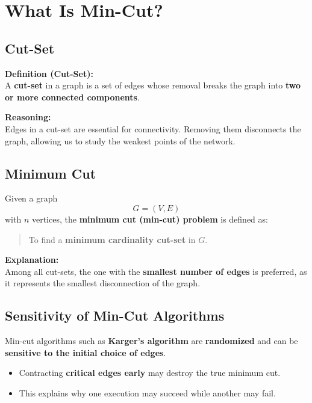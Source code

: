\documentclass[11pt]{article}
\begin{document}

\section{What Is Min-Cut?}

\subsection{Cut-Set}

\textbf{Definition (Cut-Set):} \\
A \textbf{cut-set} in a graph is a set of edges whose removal breaks the graph into \textbf{two or more connected components}.

\medskip
\textbf{Reasoning:} \\
Edges in a cut-set are essential for connectivity. Removing them disconnects the graph, allowing us to study the weakest points of the network.

\subsection{Minimum Cut}

Given a graph
\[
G = (V, E)
\]
with $n$ vertices, the \textbf{minimum cut (min-cut) problem} is defined as:

\begin{quote}
To find a \textbf{minimum cardinality cut-set} in $G$.
\end{quote}

\noindent
\textbf{Explanation:} \\
Among all cut-sets, the one with the \textbf{smallest number of edges} is preferred, as it represents the smallest disconnection of the graph.

\subsection{Sensitivity of Min-Cut Algorithms}

Min-cut algorithms such as \textbf{Karger’s algorithm} are \textbf{randomized} and can be \textbf{sensitive to the initial choice of edges}.

\begin{itemize}
    \item Contracting \textbf{critical edges early} may destroy the true minimum cut.
    \item This explains why one execution may succeed while another may fail.
\end{itemize}
\end{document}

